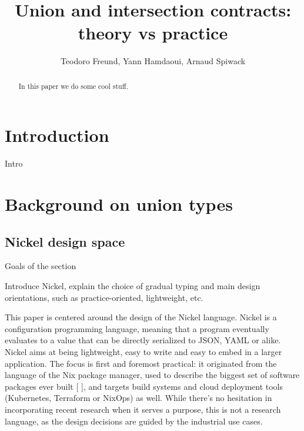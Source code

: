 \documentclass{article}
\title{Union and intersection contracts: theory vs practice}
\author{Teodoro Freund, Yann Hamdaoui, Arnaud Spiwack}
\begin{document}
\maketitle

\begin{abstract}
 In this paper we do some cool stuff.
\end{abstract}

\section*{Introduction}
Intro

\section{Background on union types}

\subsection{Nickel design space}

\color{red}Goals of the section

Introduce Nickel, explain the choice of gradual
typing and main design orientations, such as practice-oriented, lightweight,
etc.\vspace{0.5cm}\color{black}

This paper is centered around the design of the Nickel language. Nickel is a
configuration programming language, meaning that a program eventually evaluates
to a value that can be directly serialized to JSON, YAML or alike. Nickel aims at
being lightweight, easy to write and easy to embed in a larger application. The
focus is first and foremost practical: it originated from the language of the Nix
package manager, used to describe the biggest set of software packages ever
built [ ], and targets build systems and cloud deployment tools (Kubernetes,
Terraform or NixOps) as well. While there's no hesitation in incorporating recent
research when it serves a purpose, this is not a research language, as the
design decisions are guided by the industrial use cases. 
\end{document}
